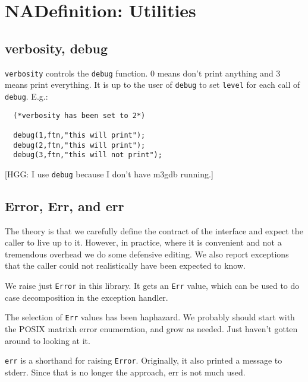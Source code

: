 \section{NADefinition: Utilities}

\subsection*{verbosity, debug}
{\tt verbosity} controls the {\tt debug} function.
0 means don't print anything and 3 means print everything.
It is up to the user of {\tt debug} to
set {\tt level} for each call of {\tt debug}.  E.g.:

\begin {tt} \begin{verbatim}
  (*verbosity has been set to 2*)

  debug(1,ftn,"this will print");
  debug(2,ftn,"this will print");
  debug(3,ftn,"this will not print");
\end{verbatim} \end{tt}

[HGG: I use {\tt debug} because I don't have m3gdb running.]

\subsection*{Error, Err, and err}
The theory is that we carefully define the contract of the interface and
expect the caller to live up to it.  However, in practice, where
it is convenient and not a tremendous overhead we do some defensive
editing.  We also report exceptions that the caller could not
realistically have been expected to know.

We raise just {\tt Error} in this library.
It gets an {\tt Err} value, which can be
used to do case decomposition in the exception handler.

The selection of {\tt Err} values has been haphazard.  We probably should
start with the POSIX matrixh error enumeration, and grow as needed.
Just haven't gotten around to looking at it.

{\tt err} is a shorthand for raising {\tt Error}.
Originally, it also printed
a message to stderr. Since that is no longer the approach, err is not
much used.

 
